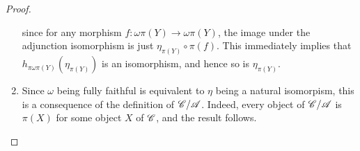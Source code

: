 \documentclass[dissertation.tex]{subfiles}
\begin{document}
\begin{lem}
\begin{proof}
\begin{enumerate}
\begin{center}
      \end{center}
      since for any morphism $f \colon \omega\pi(Y) \rightarrow \omega\pi(Y)$, the image under the adjunction isomorphism is just $\eta_{\pi(Y)} \circ \pi(f)$.
      This immediately implies that $h_{\pi\omega\pi(Y)}(\eta_{\pi(Y)})$ is an isomorphism, and hence so is $\eta_{\pi(Y)}$.
    \item
      Since $\omega$ being fully faithful is equivalent to $\eta$ being a natural isomorpism, this is a consequence of the definition of $\mathscr{C}/\mathscr{A}$.  
      Indeed, every object of $\mathscr{C}/\mathscr{A}$ is $\pi(X)$ for some object $X$ of $\mathscr{C}$, and the result follows.
    \end{enumerate}
  \end{proof}
\end{lem}

\end{document}
